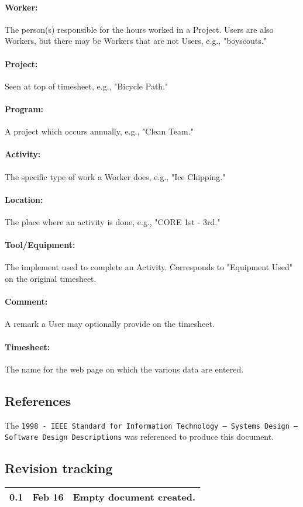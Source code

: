 \documentclass[12pt]{article}
\begin{document}
\paragraph{Worker:} The person(s) responsible for the hours worked in a Project. Users are also Workers, but there may be Workers that are not Users, e.g., "boyscouts."
\paragraph{Project:} Seen at top of timesheet, e.g., "Bicycle Path."
\paragraph{Program:} A project which occurs annually, e.g., "Clean Team."
\paragraph{Activity:} The specific type of work a Worker does, e.g., "Ice Chipping."
\paragraph{Location:} The place where an activity is done, e.g., "CORE 1st - 3rd."
\paragraph{Tool/Equipment:} The implement used to complete an Activity. Corresponds to "Equipment Used" on the original timesheet.
\paragraph{Comment:} A remark a User may optionally provide on the timesheet.
\paragraph{Timesheet:} The name for the web page on which the various data are entered.

\subsection{References}
The {\tt 1998 - IEEE Standard for Information Technology -- Systems Design -- Software Design Descriptions} was referenced to produce this document.

\subsection{Revision tracking}
\begin{tabular}{|l|r|p{4.6in}|}
\hline
0.1 & Feb 16 & Empty document created.\\
\hline
\end{tabular}
\end{document}
